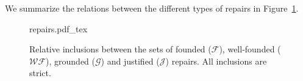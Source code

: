 We summarize the relations between the different types of repairs in
Figure~\ref{fig:repairs}.
%
\begin{figure}
  \centering
  \def\svgwidth{.5\columnwidth}
  {repairs.pdf_tex}
  \caption{Relative inclusions between the sets of founded ($\mathcal F$), well-founded ($\mathcal{WF}$), grounded ($\mathcal G$) and justified ($\mathcal J$) repairs.
  All inclusions are strict.}
  \label{fig:repairs}
\end{figure}

